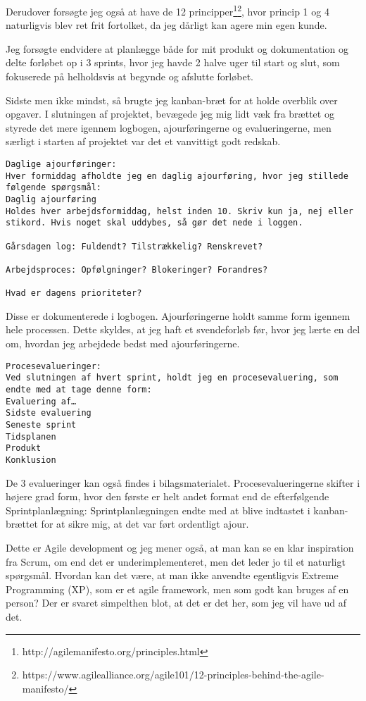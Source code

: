 \documentclass{report}
\begin{document}
Derudover forsøgte jeg også at have de 12 principper\footnote{http://agilemanifesto.org/principles.html}\footnote{https://www.agilealliance.org/agile101/12-principles-behind-the-agile-manifesto/}, hvor princip 1 og 4 naturligvis blev  ret frit fortolket, da jeg dårligt kan agere min egen kunde.\par{}
Jeg forsøgte endvidere at planlægge både for mit produkt og dokumentation og delte forløbet op i 3 sprints, hvor jeg havde 2 halve uger til start og slut, som fokuserede på helholdsvis at begynde og afslutte forløbet.\par{}
Sidste men ikke mindst, så brugte jeg kanban-bræt for at holde overblik over opgaver. I slutningen af projektet, bevægede jeg mig lidt væk fra brættet og styrede det mere igennem logbogen, ajourføringerne og evalueringerne, men særligt i starten af projektet var det et vanvittigt godt redskab.
\begin{lstlisting}
Daglige ajourføringer:
Hver formiddag afholdte jeg en daglig ajourføring, hvor jeg stillede følgende spørgsmål:
Daglig ajourføring
Holdes hver arbejdsformiddag, helst inden 10. Skriv kun ja, nej eller stikord. Hvis noget skal uddybes, så gør det nede i loggen.

Gårsdagen log: Fuldendt? Tilstrækkelig? Renskrevet?

Arbejdsproces: Opfølgninger? Blokeringer? Forandres?

Hvad er dagens prioriteter?

\end{lstlisting}
Disse er dokumenterede i logbogen. Ajourføringerne holdt samme form igennem hele processen. Dette skyldes, at jeg haft et svendeforløb før, hvor jeg lærte en del om, hvordan jeg arbejdede bedst med ajourføringerne.

\begin{lstlisting}
Procesevalueringer:
Ved slutningen af hvert sprint, holdt jeg en procesevaluering, som endte med at tage denne form:
Evaluering af…
Sidste evaluering
Seneste sprint
Tidsplanen
Produkt
Konklusion
\end{lstlisting}

De 3 evalueringer kan også findes i bilagsmaterialet. Procesevalueringerne skifter i højere grad form, hvor den første er helt andet format end de efterfølgende
Sprintplanlægning:
Sprintplanlægningen endte med at blive indtastet i kanban-brættet for at  sikre mig, at det var ført ordentligt ajour.

Dette er Agile development og jeg mener også, at man kan se en klar inspiration fra Scrum, om end det er underimplementeret, men det leder jo til et naturligt spørgsmål. Hvordan kan det være, at man ikke anvendte egentligvis Extreme Programming (XP), som  er et agile framework, men som godt kan bruges af en person? Der er svaret simpelthen blot, at det er det her, som jeg vil have ud af det.
\end{document}
